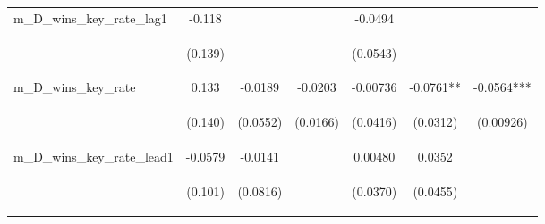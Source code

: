 \documentclass[]{article}
\begin{document}
\begin{center}
\begin{tabular}{lcccccc}
m\_D\_wins\_key\_rate\_lag1 & -0.118 &  &  & -0.0494 &  &  \\
\vspace{4pt} & \begin{footnotesize}(0.139)\end{footnotesize} & \begin{footnotesize}\end{footnotesize} & \begin{footnotesize}\end{footnotesize} & \begin{footnotesize}(0.0543)\end{footnotesize} & \begin{footnotesize}\end{footnotesize} & \begin{footnotesize}\end{footnotesize} \\
m\_D\_wins\_key\_rate & 0.133 & -0.0189 & -0.0203 & -0.00736 & -0.0761** & -0.0564*** \\
\vspace{4pt} & \begin{footnotesize}(0.140)\end{footnotesize} & \begin{footnotesize}(0.0552)\end{footnotesize} & \begin{footnotesize}(0.0166)\end{footnotesize} & \begin{footnotesize}(0.0416)\end{footnotesize} & \begin{footnotesize}(0.0312)\end{footnotesize} & \begin{footnotesize}(0.00926)\end{footnotesize} \\
m\_D\_wins\_key\_rate\_lead1 & -0.0579 & -0.0141 &  & 0.00480 & 0.0352 &  \\
\vspace{4pt} & \begin{footnotesize}(0.101)\end{footnotesize} & \begin{footnotesize}(0.0816)\end{footnotesize} & \begin{footnotesize}\end{footnotesize} & \begin{footnotesize}(0.0370)\end{footnotesize} & \begin{footnotesize}(0.0455)\end{footnotesize} & \begin{footnotesize}\end{footnotesize} \\

\end{tabular}
\end{center}
\end{document}
